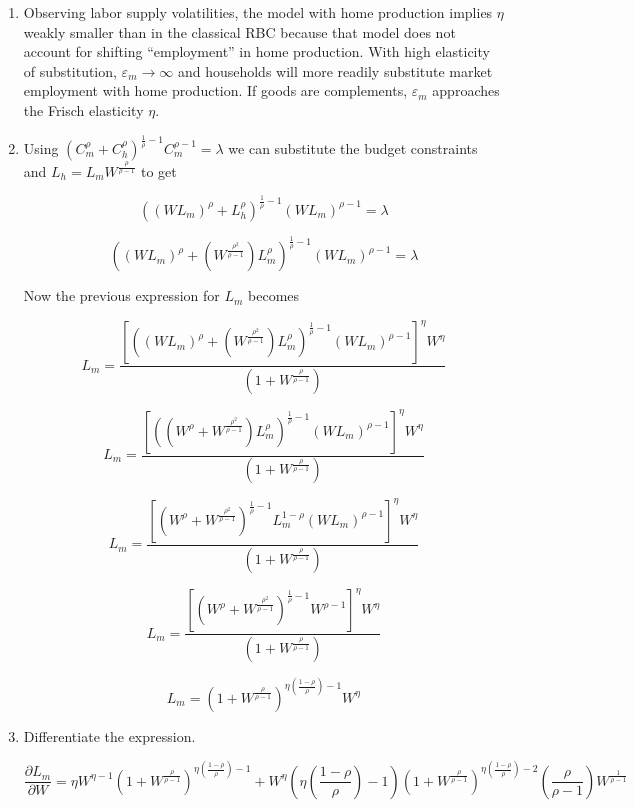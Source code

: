 \documentclass[11pt]{article}
\begin{document}
\begin{enumerate}
        \item Observing labor supply volatilities, the model with home production implies $\eta$ weakly smaller than in the classical RBC because that model does not account for shifting ``employment'' in home production. With high elasticity of substitution, $\varepsilon_m \to \infty$ and households will more readily substitute market employment with home production. If goods are complements, $\varepsilon_m$ approaches the Frisch elasticity $\eta$.

        \item Using $\left( C_m^\rho + C_h^\rho \right)^{\frac{1}{\rho} -1}  C_m^{\rho-1} = \lambda$ we can substitute the budget constraints and $L_h = L_m W^{\frac{\rho}{\rho-1}}$ to get

            $$ ((W L_m)^{\rho} + L_h^{\rho})^{\frac{1}{\rho} -1} (W L_m)^{\rho-1} = \lambda $$

        	$$ ((W L_m)^{\rho} + ( W^{\frac{\rho^2}{\rho-1}}) L_m^{\rho})^{\frac{1}{\rho} -1} (W L_m)^{\rho-1} = \lambda $$

        Now the previous expression for $L_m$ becomes

        	$$ L_m = \frac{ \left[((W L_m)^{\rho} + ( W^{\frac{\rho^2}{\rho-1}}) L_m^{\rho})^{\frac{1}{\rho} -1} (W L_m)^{\rho-1}\right]^{\eta} W^{\eta}}{(1 + W^{\frac{\rho}{\rho-1}})} $$

        	$$ L_m = \frac{ \left[((W^{\rho} + W^{\frac{\rho^2}{\rho-1}}) L_m^{\rho})^{\frac{1}{\rho} -1} (W L_m)^{\rho-1}\right]^{\eta} W^{\eta}}{(1 + W^{\frac{\rho}{\rho-1}})} $$

        	$$ L_m = \frac{ \left[(W^{\rho} + W^{\frac{\rho^2}{\rho-1}})^{\frac{1}{\rho} -1} L_m^{1-\rho} (W L_m)^{\rho-1}\right]^{\eta} W^{\eta}}{(1 + W^{\frac{\rho}{\rho-1}})} $$

        	$$ L_m = \frac{ \left[(W^{\rho} + W^{\frac{\rho^2}{\rho-1}})^{\frac{1}{\rho} -1}  W ^{\rho-1}\right]^{\eta} W^{\eta}}{(1 + W^{\frac{\rho}{\rho-1}})} $$

        	$$ L_m = \left( 1 + W^{\frac{\rho}{\rho-1}} \right)^{\eta \left( \frac{1-\rho}{\rho} \right) -1} W^\eta $$


        \item Differentiate the expression.

        	\begin{equation*}
        	\frac{\partial L_m}{\partial W} = \eta W^{\eta -1 } \left( 1 + W^{\frac{\rho}{\rho-1}} \right)^{\eta \left( \frac{1-\rho}{\rho} \right) -1} + W^\eta \left( \eta \left( \frac{1-\rho}{\rho} \right) -1  \right)  \left( 1 + W^{\frac{\rho}{\rho-1}} \right)^{\eta \left( \frac{1-\rho}{\rho} \right) -2} \left( \frac{\rho}{\rho-1} \right) W^{\frac{1}{\rho-1}}
        	\end{equation*}


\end{enumerate}
\end{document}
